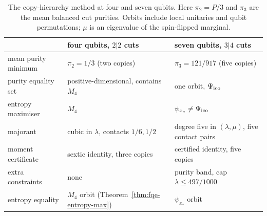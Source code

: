 \begin{table}[ht]
\centering\small
\renewcommand{\arraystretch}{1.15}
\begin{tabular}{@{}lll@{}}
\toprule
 & four qubits, $2|2$ cuts & seven qubits, $3|4$ cuts\\
\midrule
mean purity minimum & $\pi_2=1/3$ (two copies) & $\pi_3=121/917$ (five copies)\\
purity equality set & positive-dimensional, contains $M_4$ & one orbit, $\Psi_{\mathrm{ico}}$\\
entropy maximiser & $M_4$ & $\psi_{x_*}\ne\Psi_{\mathrm{ico}}$\\
majorant & cubic in $\lambda$, contacts $1/6,1/2$ & degree five in $(\lambda,\mu)$, five contact pairs\\
moment certificate & sextic identity, three copies & certified identity, five copies\\
extra constraints & none & purity band, cap $\lambda\le497/1000$\\
entropy equality & $M_4$ orbit (Theorem~\ref{thm:fqe-entropy-max}) & $\psi_{x_*}$ orbit\\
\bottomrule
\end{tabular}
\caption{The copy-hierarchy method at four and seven qubits. Here $\pi_2=P/3$ and $\pi_3$ are the mean balanced cut
purities. Orbits include local unitaries and qubit permutations; $\mu$ is an eigenvalue of the spin-flipped marginal.}
\label{tab:fqe-four-seven}
\end{table}
